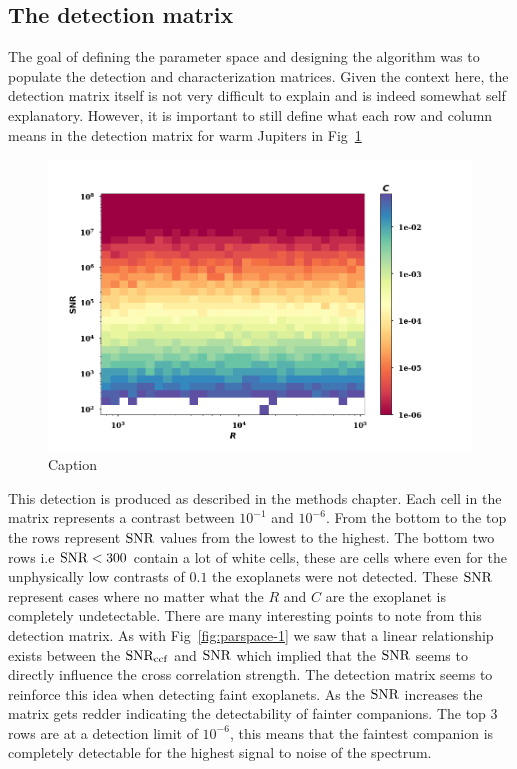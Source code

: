 \subsection{The detection matrix }
The goal of defining the parameter space and designing the algorithm was to populate the detection and characterization matrices.
Given the context here, the detection matrix itself is not very difficult to explain and is indeed somewhat self explanatory. 
However, it is important to still define what each row and column means in the detection matrix for warm Jupiters in Fig~\ref{fig:detmat}
\begin{figure}[!ht]
    \centering
    \includegraphics[scale=0.5]{images/Chapter3/detmat.png}
    \caption{Caption}
    \label{fig:detmat}
\end{figure}
This detection is produced as described in the methods chapter.
Each cell in the matrix represents a contrast between $10^{-1}$ and $10^{-6}$.
From the bottom to the top the rows represent $\rm{SNR}$ values from the lowest to the highest.
The bottom two rows i.e $\rm{SNR}<300$ contain a lot of white cells, these are cells where even for the unphysically low contrasts of $0.1$ the exoplanets were not detected. 
These $\rm{SNR}$ represent cases where no matter what the $R$ and $C$ are the exoplanet is completely undetectable.
There are many interesting points to note from this detection matrix.
As with Fig~\ref{fig:parspace-1} we saw that a linear relationship exists between the $\rm{SNR_{ccf}}$ and $\rm{SNR}$ which implied that the $\rm{SNR}$ seems to directly influence the cross correlation strength.
The detection matrix seems to reinforce this idea when detecting faint exoplanets.
As the $\rm{SNR}$ increases the matrix gets redder indicating the detectability of fainter companions. 
The top $3$ rows are at a detection limit of $10^{-6}$, this means that the faintest companion is completely detectable for the highest signal to noise of the spectrum.

